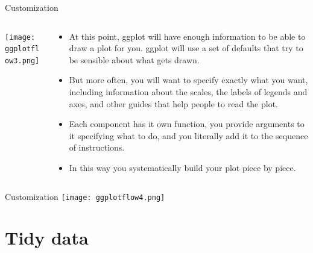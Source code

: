 \documentclass[10pt]{beamer}\usepackage[]{graphicx}\usepackage[]{color}
\begin{document}
\begin{frame}{Customization}
	\begin{columns}
		\begin{column}{0.5\textwidth}  %
			\begin{center}
				\texttt{[image: ggplotflow3.png]}
			\end{center}
		\end{column}
		\begin{column}{0.5\textwidth}
			\begin{itemize}
				\item At this point, ggplot will have enough information to be able to draw
				a plot for you. ggplot will use a set of defaults that try to be sensible about what gets drawn. 
				\item But more often, you will want to specify exactly what you want, including
				information about the scales, the labels of legends and axes, and
				other guides that help people to read the plot. 
				\item Each component has it own function, you provide arguments to it
				specifying what to do, and you literally add it to the sequence of
				instructions. 
				\item In this way you systematically build your plot piece by
				piece.
			\end{itemize}
		\end{column}
	\end{columns}
\end{frame}



\begin{frame}{Customization}
	\centering
	\texttt{[image: ggplotflow4.png]}
\end{frame}


	
\section{Tidy data}
\end{document}
